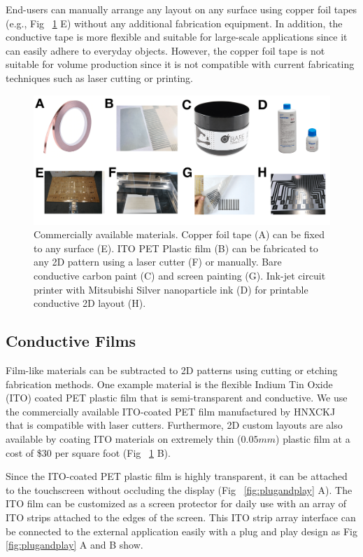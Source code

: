 End-users can manually arrange any layout on any surface using copper foil tapes (e.g., Fig ~\ref{fig:material} E) without any additional fabrication equipment. In addition, the conductive tape is more flexible and suitable for large-scale applications since it can easily adhere to everyday objects. However, the copper foil tape is not suitable for volume production since it is not compatible with current fabricating techniques such as laser cutting or printing.

\begin{figure}
\centering
  \includegraphics[width=0.95\columnwidth]{figures/material.png}
  \setlength{\belowcaptionskip}{-6pt}
  \caption{Commercially available materials. Copper foil tape (A) can be fixed to any surface (E). ITO PET Plastic film (B) can be fabricated to any 2D pattern using a laser cutter (F) or manually. Bare conductive carbon paint (C) and screen painting (G). Ink-jet circuit printer with Mitsubishi Silver nanoparticle ink (D) for printable conductive 2D layout (H). }
  \label{fig:material}
\end{figure}

\subsection{Conductive Films}
Film-like materials can be subtracted to 2D patterns using cutting or etching fabrication methods. One example material is the flexible Indium Tin Oxide (ITO) coated PET plastic film that is semi-transparent and conductive. We use the commercially available ITO-coated PET film manufactured by HNXCKJ ~\cite{ITO} that is compatible with laser cutters. Furthermore, 2D custom layouts are also available by coating ITO materials on extremely thin ($0.05 mm$) plastic film at a cost of \$30 per square foot (Fig ~\ref{fig:material} B).

Since the ITO-coated PET plastic film is highly transparent, it can be attached to the touchscreen without occluding the display (Fig ~\ref{fig:plugandplay} A). The ITO film can be customized as a screen protector for daily use with an array of ITO strips attached to the edges of the screen. This ITO strip array interface can be connected to the external application easily with a plug and play design as Fig \ref{fig:plugandplay} A and B show.

